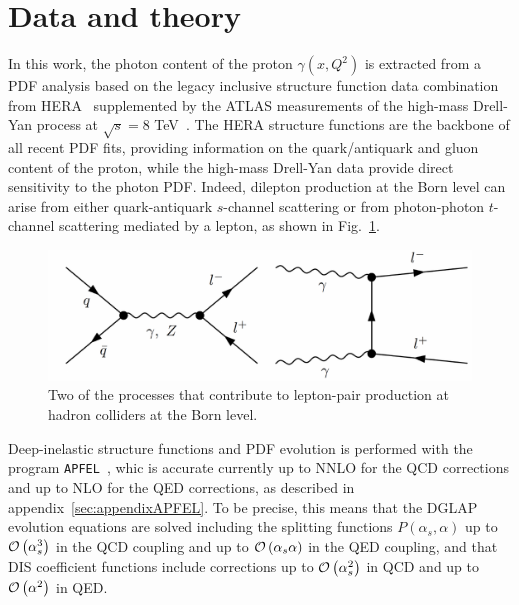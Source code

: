\section{Data and theory}
\label{sec:theory}

In this work, the photon
content of the proton $\gamma(x,Q^2)$ is extracted from a PDF analysis based
on the legacy inclusive structure function data combination from HERA~\cite{Abramowicz:2015mha}
supplemented by the ATLAS measurements of the high-mass Drell-Yan process
at $\sqrt{s}=8$ TeV~\cite{Aad:2016zzw}.
%
The HERA structure functions are the backbone of all
recent PDF fits, providing information on the quark/antiquark and gluon content of 
the proton, while the high-mass Drell-Yan data provide
direct sensitivity to the photon PDF.
%
Indeed, dilepton production at the Born level can arise  from either quark-antiquark $s$-channel
scattering or from photon-photon $t$-channel scattering mediated by a lepton,
as shown in Fig.~\ref{fig:photoninduced}.

\begin{figure}[t]
  \begin{center}
    \includegraphics[width=15cm]{figs/photoninduced.pdf}
    \end{center}
  \caption{Two of the processes that contribute to lepton-pair
  production at hadron colliders at the Born level.}
\label{fig:photoninduced}
\end{figure}

Deep-inelastic structure functions and PDF evolution is performed
with the program {\tt APFEL}~\cite{Bertone:2013vaa}, whic is accurate currently 
up to NNLO for the QCD corrections and up to NLO for the QED corrections, as described in appendix~\ref{sec:appendixAPFEL}.
%
To be precise, this means that the DGLAP evolution equations \cite{XXXXXX} are solved including
the splitting functions $P(\alpha_s,\alpha)$ up to $\mathcal{O}\left( \alpha_s^3\right)$ in the QCD
coupling and up to $\mathcal{O}\left( \alpha_s\alpha\right)$ in the QED coupling,
and that DIS coefficient functions include corrections up to $\mathcal{O}\left( \alpha_s^2\right)$
in QCD and up to $\mathcal{O}\left( \alpha^2\right)$ in QED.

